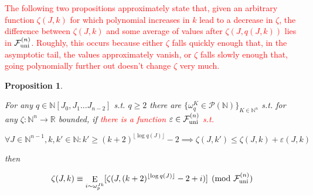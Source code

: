 \documentclass[11pt]{article}
\numberwithin{equation}{section}
\theoremstyle{definition}
\theoremstyle{plain}
\newtheorem{proposition}{Proposition}[section]
\DeclareMathOperator{\E}{E}
\newcommand{\Nats}{\mathbb{N}}
\newcommand{\Reals}{\mathbb{R}}
\newcommand{\NatPolyJ}{\Nats[J_0, J_1 \ldots J_{n-2}]}
\newcommand{\NatFun}{\Nats^n \rightarrow}
\newcommand{\Floor}[1]{\lfloor #1 \rfloor}
\newcommand{\Fall}{\mathcal{F}}
\newcommand{\FallU}{{\Fall_{\textnormal{uni}}^{(n)}}}
\begin{document}
\begin{samepage}

\textcolor{red}{The following two propositions approximately state that, given an arbitrary function $\zeta(J,k)$ for which polynomial increases in $k$ lead to a decrease in $\zeta$, the difference between $\zeta(J,k)$ and some average of values after $\zeta(J,q(J,k))$ lies in $\FallU$. Roughly, this occurs because either $\zeta$ falls quickly enough that, in the asymptotic tail, the values approximately vanish, or $\zeta$ falls slowly enough that, going polynomially further out doesn't change $\zeta$ very much.}

\begin{proposition}
\label{prp:fall_uni_weak}

For any ${q \in \NatPolyJ}$ s.t. ${q \geq 2}$ there are ${\{\omega_q^K \in \mathcal{P}(\Nats)\}_{K \in \Nats^n}}$ s.t. for any ${\zeta: \NatFun \Reals}$ bounded, if \textcolor{red}{there is a function $\varepsilon\in\FallU$ s.t.}

\begin{equation}
\label{eqn:prp__fall_uni_weak__prem}
\forall J \in \Nats^{n-1}, k,k' \in \Nats: k' \geq (k+2)^{\Floor{\log q(J)}}-2 \implies \zeta(J,k') \leq \zeta(J,k)+\varepsilon(J,k)
\end{equation}

then

\begin{equation}
\label{eqn:prp__fall_uni_weak__conc}
\zeta(J,k) \equiv \E_{i \sim \omega_p^{Jk}}[\zeta(J,(k+2)^{\Floor{\log q(J)}}-2+i)] \pmod \FallU
\end{equation}

\end{proposition}
\end{samepage}
\end{document}
